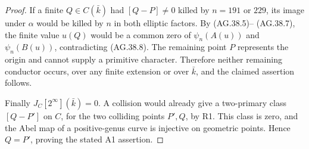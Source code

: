\begin{proof}
If a finite \(Q\in C(\bar k)\) had \([Q-P]\ne0\) killed
by \(n=191\) or \(229\), its image under \(\alpha\) would
be killed by \(n\) in both elliptic factors. By (AG.38.5)--
(AG.38.7), the finite value \(u(Q)\) would be a common zero of
\(\psi_n(A(u))\) and \(\psi_n(B(u))\), contradicting
(AG.38.8). The remaining point \(P\) represents the origin
and cannot supply a primitive character. Therefore neither
remaining conductor occurs, over any finite extension or over
\(\bar k\), and the claimed assertion follows.

Finally \(J_C[2^\infty](\bar k)=0\). A collision would already
give a two-primary class \([Q-P']\) on \(C\), for the two
colliding points \(P',Q\), by R1. This class is zero, and the
Abel map of a positive-genus curve is injective on geometric
points. Hence \(Q=P'\), proving the stated A1 assertion.
\end{proof}
